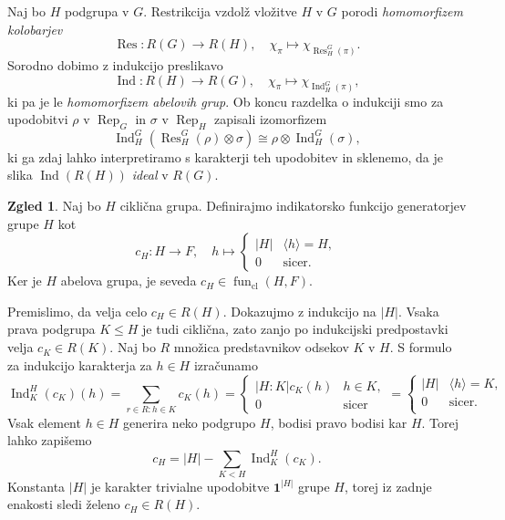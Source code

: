 \documentclass[11pt]{book}
\def\oneone{\mathbf{1}}
\DeclareMathOperator\Res{Res}
\DeclareMathOperator\Ind{Ind}
\DeclareMathOperator\Rep{Rep}
\DeclareMathOperator\cl{cl}
\DeclareMathOperator\fun{fun}
\theoremstyle{definition}
\theoremstyle{zgled}
\newtheorem{zgled}[theorem]{Zgled}
\theoremstyle{zgledbrezstevilke}
\theoremstyle{odprtproblem}
\theoremstyle{domacanaloga}
\theoremstyle{izrek}
\begin{document}
Naj bo $H$ podgrupa v $G$. Restrikcija vzdolž vložitve $H$ v $G$ porodi \emph{homomorfizem kolobarjev}
\[
    \textstyle \Res \colon R(G) \to R(H), \quad \chi_{\pi} \mapsto \chi_{\Res^G_H(\pi)}.
\]
Sorodno dobimo z indukcijo preslikavo
\[
    \textstyle \Ind \colon R(H) \to R(G), \quad \chi_{\pi} \mapsto \chi_{\Ind^G_H(\pi)},
\]
ki pa je le \emph{homomorfizem abelovih grup}. Ob koncu razdelka o indukciji smo za upodobitvi $\rho$ v $\Rep_G$ in $\sigma$ v $\Rep_H$ zapisali izomorfizem
\[
    \textstyle \Ind^G_H(\Res^G_H(\rho) \otimes \sigma) \cong
        \rho \otimes \Ind^G_H(\sigma),
\]
ki ga zdaj lahko interpretiramo s karakterji teh upodobitev in sklenemo, da je slika $\Ind(R(H))$ \emph{ideal} v $R(G)$.

\begin{zgled}
Naj bo $H$ ciklična grupa. Definirajmo indikatorsko funkcijo generatorjev grupe $H$ kot
\[
    c_H \colon H \to F, \quad
    h \mapsto \begin{cases} |H| & \langle h \rangle = H, \\ 0 & \text{sicer.} \end{cases}
\]
Ker je $H$ abelova grupa, je seveda $c_H \in \fun_{\cl}(H,F)$. 

Premislimo, da velja celo $c_H \in R(H)$. Dokazujmo z indukcijo na $|H|$. Vsaka prava podgrupa $K \leq H$ je tudi ciklična, zato zanjo po indukcijski predpostavki velja $c_K \in R(K)$. Naj bo $R$ množica predstavnikov odsekov $K$ v $H$. S formulo za indukcijo karakterja za $h \in H$ izračunamo
\[
    {\textstyle \Ind^H_K(c_K)(h)} = \sum_{r \in R \colon h \in K} c_K(h) =
    \begin{cases} |H:K| c_K(h) & h \in K, \\ 0 & \text{sicer}  \end{cases} =
    \begin{cases}  |H| & \langle h \rangle = K, \\ 0 & \text{sicer.} \\ \end{cases}
\]
Vsak element $h \in H$ generira neko podgrupo $H$, bodisi pravo bodisi kar $H$. Torej lahko zapišemo
\[
    c_H = |H| - \sum_{K < H} \textstyle  \Ind^H_K(c_K).
\]
Konstanta $|H|$ je karakter trivialne upodobitve $\oneone^{|H|}$ grupe $H$, torej iz zadnje enakosti sledi želeno $c_H \in R(H)$. 
\end{zgled}
\end{document}
